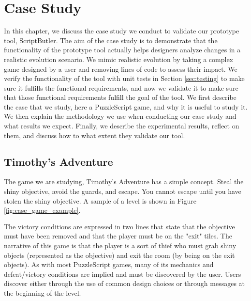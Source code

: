 \chapter{Case Study}
\label{ch:case}
In this chapter, we discuss the case study we conduct to validate our prototype tool, ScriptButler. The aim of the case study is to demonstrate that the functionality of the prototype tool actually helps designers analyze changes in a realistic evolution scenario. We mimic realistic evolution by taking a complex game designed by a user and removing lines of code to assess their impact. We verify the functionality of the tool with unit tests in Section \ref{sec:testing} to make sure it fulfills the functional requirements, and now we validate it to make sure that those functional requirements fulfill the goal of the tool. We first describe the case that we study, here a PuzzleScript game, and why it is useful to study it. We then explain the methodology we use when conducting our case study and what results we expect. Finally, we describe the experimental results, reflect on them, and discuss how to what extent they validate our tool.

\section{Timothy's Adventure}
The game we are studying, Timothy's Adventure\cite{timothy} has a simple concept. Steal the shiny objective, avoid the guards, and escape. You cannot escape until you have stolen the shiny objective. A sample of a level is shown in Figure \ref{fig:case_game_example}.

The victory conditions are expressed in two lines that state that the objective must have been removed and that the player must be on the "exit" tiles. The narrative of this game is that the player is a sort of thief who must grab shiny objects (represented as the objective) and exit the room (by being on the exit objects). As with most PuzzleScript games, many of its mechanics and defeat/victory conditions are implied and must be discovered by the user. Users discover either through the use of common design choices or through messages at the beginning of the level.

